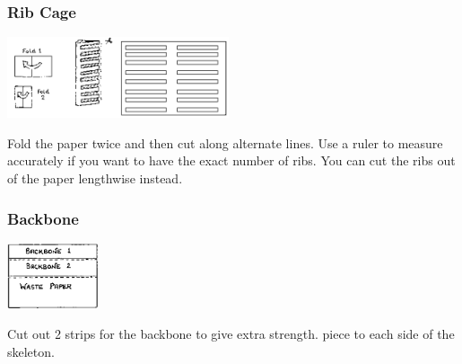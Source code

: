 \begin{multicols}{2}
\subsubsection{Rib Cage}

\begin{center}
\includegraphics[width=0.49\textwidth]{./img/source/skeleton-ribs.png}
\end{center}
Fold the paper twice and then cut along alternate lines. Use a ruler to
measure accurately if you want to have the exact number of ribs. You
can cut the ribs out of the paper lengthwise instead.

\subsubsection{Backbone}

\begin{center}
\includegraphics[width=0.2\textwidth]{./img/source/skeleton-backbone.png}
\end{center}
Cut out 2 strips for the backbone
to give extra strength. 
piece to each side of the skeleton.


\end{multicols}
